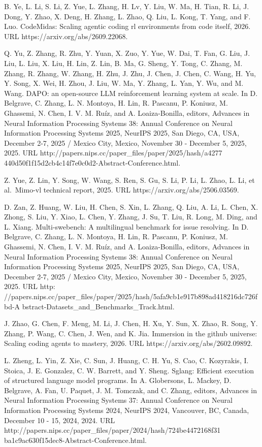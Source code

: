 \documentclass[
  10
]{article}
\begin{document}
B. Ye, L. Li, S. Li, Z. Yue, L. Zhang, H. Lv, Y. Liu, W. Ma, H. Tian, R.
Li, J. Dong, Y. Zhao, X. Deng, H. Zhang, L. Zhao, Q. Liu, L. Kong, T.
Yang, and F. Luo. CodeMidas: Scaling agentic coding rl environments from
code itself, 2026. URL https://arxiv.org/abs/2609.22068.

Q. Yu, Z. Zhang, R. Zhu, Y. Yuan, X. Zuo, Y. Yue, W. Dai, T. Fan, G.
Liu, J. Liu, L. Liu, X. Liu, H. Lin, Z. Lin, B. Ma, G. Sheng, Y. Tong,
C. Zhang, M. Zhang, R. Zhang, W. Zhang, H. Zhu, J. Zhu, J. Chen, J.
Chen, C. Wang, H. Yu, Y. Song, X. Wei, H. Zhou, J. Liu, W. Ma, Y. Zhang,
L. Yan, Y. Wu, and M. Wang. DAPO: an open-source LLM reinforcement
learning system at scale. In D. Belgrave, C. Zhang, L. N. Montoya, H.
Lin, R. Pascanu, P. Koniusz, M. Ghassemi, N. Chen, I. V. M. Ruíz, and A.
Loaiza-Bonilla, editors, Advances in Neural Information Processing
Systems 38: Annual Conference on Neural Information Processing Systems
2025, NeurIPS 2025, San Diego, CA, USA, December 2-7, 2025 / Mexico
City, Mexico, November 30 - December 5, 2025, 2025. URL
http://papers.nips.cc/paper\_files/paper/2025/hash/a4277
440d50f1f15d2cb4c14f7e0c0d2-Abstract-Conference.html.

Z. Yue, Z. Lin, Y. Song, W. Wang, S. Ren, S. Gu, S. Li, P. Li, L. Zhao,
L. Li, et al.~Mimo-vl technical report, 2025. URL
https://arxiv.org/abs/2506.03569.

D. Zan, Z. Huang, W. Liu, H. Chen, S. Xin, L. Zhang, Q. Liu, A. Li, L.
Chen, X. Zhong, S. Liu, Y. Xiao, L. Chen, Y. Zhang, J. Su, T. Liu, R.
Long, M. Ding, and L. Xiang. Multi-swebench: A multilingual benchmark
for issue resolving. In D. Belgrave, C. Zhang, L. N. Montoya, H. Lin, R.
Pascanu, P. Koniusz, M. Ghassemi, N. Chen, I. V. M. Ruíz, and A.
Loaiza-Bonilla, editors, Advances in Neural Information Processing
Systems 38: Annual Conference on Neural Information Processing Systems
2025, NeurIPS 2025, San Diego, CA, USA, December 2-7, 2025 / Mexico
City, Mexico, November 30 - December 5, 2025, 2025. URL http:
//papers.nips.cc/paper\_files/paper/2025/hash/5afa9cb1e917b898ad418216dc726fbd-A
bstract-Datasets\_and\_Benchmarks\_Track.html.

J. Zhao, G. Chen, F. Meng, M. Li, J. Chen, H. Xu, Y. Sun, X. Zhao, R.
Song, Y. Zhang, P. Wang, C. Chen, J. Wen, and K. Jia. Immersion in the
github universe: Scaling coding agents to mastery, 2026. URL
https://arxiv.org/abs/2602.09892.



L. Zheng, L. Yin, Z. Xie, C. Sun, J. Huang, C. H. Yu, S. Cao, C.
Kozyrakis, I. Stoica, J. E. Gonzalez, C. W. Barrett, and Y. Sheng.
Sglang: Efficient execution of structured language model programs. In A.
Globersons, L. Mackey, D. Belgrave, A. Fan, U. Paquet, J. M. Tomczak,
and C. Zhang, editors, Advances in Neural Information Processing Systems
37: Annual Conference on Neural Information Processing Systems 2024,
NeurIPS 2024, Vancouver, BC, Canada, December 10 - 15, 2024, 2024. URL
http://papers.nips.cc/paper\_files/paper/2024/hash/724be4472168f31
ba1c9ac630f15dec8-Abstract-Conference.html.
\end{document}
